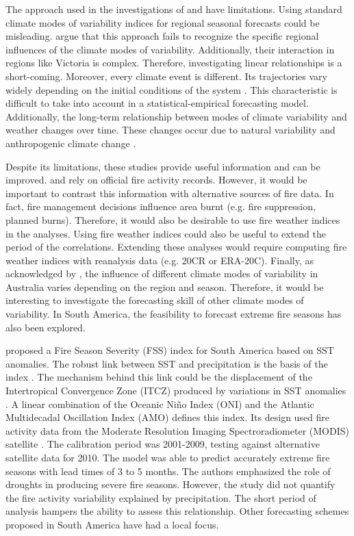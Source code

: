 The approach used in the investigations of \citet{Nicholls2007} and
\citet{Harris2013} have limitations. Using standard climate modes
of variability indices for regional seasonal forecasts could be misleading.
\citet{Verdon-Kidd2008a} argue that this approach fails to recognize
the specific regional influences of the climate modes of variability.
Additionally, their interaction in regions like Victoria is complex.
Therefore, investigating linear relationships is a short-coming. Moreover,
every climate event is different. Its trajectories vary widely depending
on the initial conditions of the system \citep{VonStorch2001}. This
characteristic is difficult to take into account in a statistical-empirical
forecasting model. Additionally, the long-term relationship between
modes of climate variability and weather changes over time. These
changes occur due to natural variability and anthropogenic climate
change \citep{Wang2013}. 

Despite its limitations, these studies provide useful information
and can be improved. \citet{Nicholls2007} and \citet{Harris2013}
rely on official fire activity records. However, it would be important
to contrast this information with alternative sources of fire data.
In fact, fire management decisions influence area burnt (e.g. fire
suppression, planned burns). Therefore, it would also be desirable
to use fire weather indices in the analyses. Using fire weather indices
could also be useful to extend the period of the correlations. Extending
these analyses would require computing fire weather indices with reanalysis
data (e.g. 20CR or ERA-20C). Finally, as acknowledged by \citet{Risbey2009b},
the influence of different climate modes of variability in Australia
varies depending on the region and season. Therefore, it would be
interesting to investigate the forecasting skill of other climate
modes of variability. In South America, the feasibility to forecast
extreme fire seasons has also been explored.

\citet{Chen2011} proposed a Fire Season Severity (FSS) index for
South America based on SST anomalies. The robust link between SST
and precipitation is the basis of the index \citep{Kousky1984,Ropelewski1987,Fernandes2011}.
The mechanism behind this link could be the displacement of the Intertropical
Convergence Zone (ITCZ) produced by variations in SST anomalies \citep{Zeng2008}.
A linear combination of the Oceanic Ni\~no Index (ONI) and the Atlantic
Multidecadal Oscillation Index (AMO) defines this index. Its design
used fire activity data from the Moderate Resolution Imaging Spectroradiometer
(MODIS) satellite \citep{Justice2002}. The calibration period was
2001-2009, testing against alternative satellite data for 2010. The
model was able to predict accurately extreme fire seasons with lead
times of 3 to 5 months. The authors emphasized the role of droughts
in producing severe fire seasons. However, the study did not quantify
the fire activity variability explained by precipitation. The short
period of analysis hampers the ability to assess this relationship.
Other forecasting schemes proposed in South America have had a local
focus.


